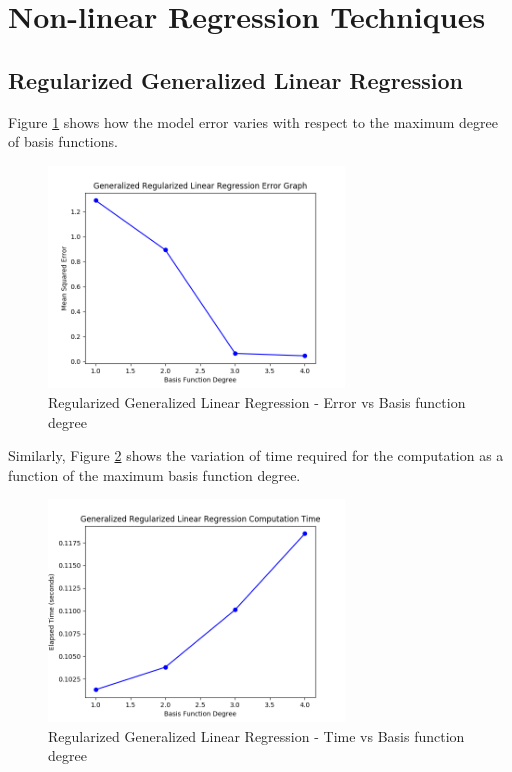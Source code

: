 \documentclass[parskip=full]{scrartcl}
\begin{document}



\newpage


\section{Non-linear Regression Techniques} %
\label{sec:non_linear_regression_techniques}

    \subsection{Regularized Generalized Linear Regression} %
    \label{sub:regularized_generalized_linear_regression}
    
        Figure \ref{fig:rglg_err_v_deg} shows how the model error varies with respect to the maximum degree of basis functions. 

        \begin{figure}
            \centering
            \includegraphics[width=0.7\textwidth]{3a_degree_vs_error.png}
            \caption{Regularized Generalized Linear Regression - Error vs Basis function degree}
            \label{fig:rglg_err_v_deg}
        \end{figure}

        Similarly, Figure \ref{fig:rglg_time_v_deg} shows the variation of time required for the computation as a function of the maximum basis function degree. 

        \begin{figure}
            \centering
            \includegraphics[width=0.7\textwidth]{3a_degree_vs_time.png}
            \caption{Regularized Generalized Linear Regression - Time vs Basis function degree}
            \label{fig:rglg_time_v_deg}
        \end{figure}
\end{document}
